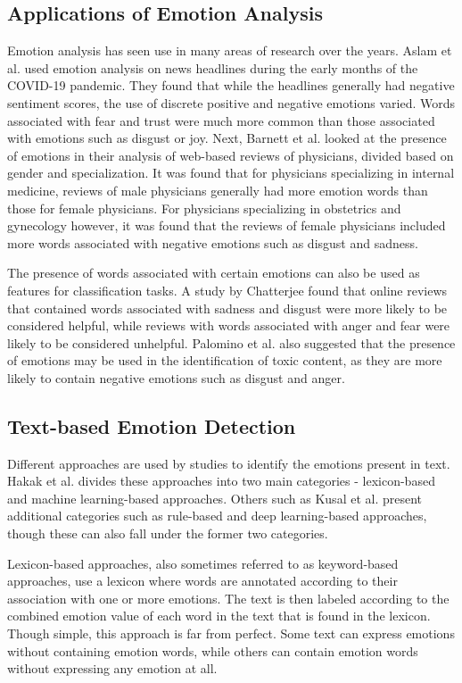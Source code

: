 \documentclass[journal]{./IEEE/IEEEtran}
\begin{document}
\subsection{Applications of Emotion Analysis}
Emotion analysis has seen use in many areas of research over the years. Aslam et al.\cite{Aslam1} used emotion analysis on news headlines during the early months of the COVID-19 pandemic. They found that while the headlines generally had negative sentiment scores, the use of discrete positive and negative emotions varied. Words associated with fear and trust were much more common than those associated with emotions such as disgust or joy. Next, Barnett et al.\cite{Barnett1} looked at the presence of emotions in their analysis of web-based reviews of physicians, divided based on gender and specialization. It was found that for physicians specializing in internal medicine, reviews of male physicians generally had more emotion words than those for female physicians. For physicians specializing in obstetrics and gynecology however, it was found that the reviews of female physicians included more words associated with negative emotions such as disgust and sadness.

The presence of words associated with certain emotions can also be used as features for classification tasks. A study by Chatterjee\cite{Chatterjee1} found that online reviews that contained words associated with sadness and disgust were more likely to be considered helpful, while reviews with words associated with anger and fear were likely to be considered unhelpful. Palomino et al.\cite{Palomino1} also suggested that the presence of emotions may be used in the identification of toxic content, as they are more likely to contain negative emotions such as disgust and anger. 

\subsection{Text-based Emotion Detection}
Different approaches are used by studies to identify the emotions present in text. Hakak et al.\cite{Hakak1} divides these approaches into two main categories - lexicon-based and machine learning-based approaches. Others such as Kusal et al.\cite{Kusal1} present additional categories such as rule-based and deep learning-based approaches, though these can also fall under the former two categories.

Lexicon-based approaches, also sometimes referred to as keyword-based approaches, use a lexicon where words are annotated according to their association with one or more emotions. The text is then labeled according to the combined emotion value of each word in the text that is found in the lexicon. Though simple, this approach is far from perfect. Some text can express emotions without containing emotion words, while others can contain emotion words without expressing any emotion at all.
\end{document}
